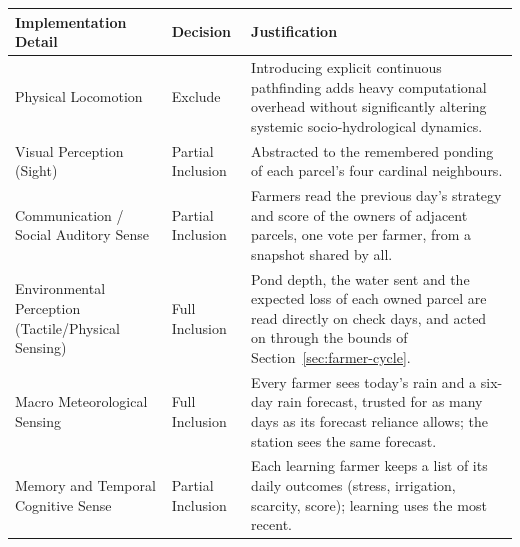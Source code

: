 \documentclass{article}
\begin{document}
\begin{changed}
\centering
\small
\begin{tabular}{|p{3.2cm}|>{\raggedright\arraybackslash}p{2.3cm}|>{\raggedright\arraybackslash}p{10.6cm}|}
\hline
\rowcolor[HTML]{F8F319}
\textbf{Implementation Detail} & \textbf{Decision} & \textbf{Justification} \\ \hline
Physical Locomotion & Exclude & Introducing explicit continuous pathfinding adds heavy computational overhead without significantly altering systemic socio-hydrological dynamics. \\ \hline
Visual Perception (Sight) & Partial Inclusion & Abstracted to the remembered ponding of each parcel's four cardinal neighbours. \\ \hline
Communication / Social Auditory Sense & Partial Inclusion & Farmers read the previous day's strategy and score of the owners of adjacent parcels, one vote per farmer, from a snapshot shared by all. \\ \hline
Environmental Perception (Tactile/Physical Sensing) & Full Inclusion & Pond depth, the water sent and the expected loss of each owned parcel are read directly on check days, and acted on through the bounds of Section~\ref{sec:farmer-cycle}. \\ \hline
Macro Meteorological Sensing & Full Inclusion & Every farmer sees today's rain and a six-day rain forecast, trusted for as many days as its forecast reliance allows; the station sees the same forecast. \\ \hline
Memory and Temporal Cognitive Sense & Partial Inclusion & Each learning farmer keeps a list of its daily outcomes (stress, irrigation, scarcity, score); learning uses the most recent. \\ \hline
\end{tabular}
\label{tab:model_scope_expanded}
\end{changed}

\end{document}
